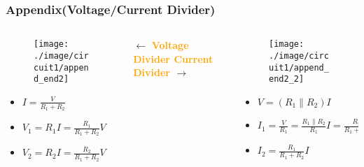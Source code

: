 \documentclass{beamer}
\newcommand{\orange}[1]{\textcolor{orange}{#1}}
\begin{document}
\begin{frame}
\frametitle{Appendix(Voltage/Current Divider)}
\begin{columns}
\begin{column}{4.2cm}
\begin{figure}[H]
  \centering
  \texttt{[image: ./image/circuit1/append\_end2]}
\end{figure}
\begin{itemize} \itemsep1pt \parskip0pt 
	\item[] $I=\frac{V}{R_1 + R_2}$
	\item[] $V_1 = R_1I = \frac{R_1}{R_1 + R_2}V$
	\item[] $V_2 = R_2I = \frac{R_2}{R_1 + R_2}V$
\end{itemize}
\end{column}

\begin{column}{4cm}
$\leftarrow $ \bf{\orange{Voltage Divider}}
\vspace{16 mm} \newline
\bf{\orange{Current Divider}} $\rightarrow $
\end{column}

\begin{column}{4cm}
\begin{figure}[H]
  \centering
  \texttt{[image: ./image/circuit1/append\_end2\_2]}
\end{figure}
\begin{itemize} \itemsep1pt \parskip0pt 
	\item[] $V = (R_1 \parallel R_2)I$
	\item[] $I_1 = \frac{V}{R_1} = \frac{R_1\parallel R_2}{R_1}I = \frac{R_2}{R_1+R_2}I$
	\item[] $I_2 = \frac{R_1}{R_1 + R_2}I$
\end{itemize}
\end{column}
\end{columns}
\end{frame}

\end{document}
